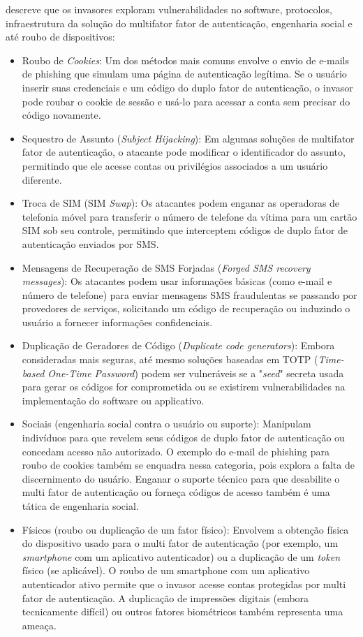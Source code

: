 \documentclass[12pt]{article}
\begin{document}
\cite{article:3} descreve que os invasores exploram vulnerabilidades no software, protocolos,
infraestrutura da solução do multifator fator de autenticação, engenharia social e até roubo
de dispositivos:
\begin{itemize}
  \item Roubo de \textit{Cookies}: Um dos métodos mais comuns envolve o envio de e-mails de phishing
  que simulam uma página de autenticação legítima.
  Se o usuário inserir suas credenciais e um código do duplo fator de autenticação, o invasor
  pode roubar o cookie de sessão e usá-lo para acessar a conta sem precisar do código
  novamente.
  \item Sequestro de Assunto (\textit{Subject Hijacking}): Em algumas soluções de multifator fator de
  autenticação, o atacante pode modificar o identificador do assunto, permitindo que ele
  acesse contas ou privilégios associados a um usuário diferente.
  \item Troca de SIM (SIM \textit{Swap}): Os atacantes podem enganar as operadoras de telefonia móvel
  para transferir o número de telefone da vítima para um cartão SIM sob seu controle,
  permitindo que interceptem códigos de duplo fator de autenticação enviados por SMS.
  \item Mensagens de Recuperação de SMS Forjadas (\textit{Forged SMS recovery messages}): Os
  atacantes podem usar informações básicas (como e-mail e número de telefone) para enviar
  mensagens SMS fraudulentas se passando por provedores de serviços, solicitando um código de
  recuperação ou induzindo o usuário a fornecer informações confidenciais.
  \item Duplicação de Geradores de Código (\textit{Duplicate code generators}): Embora consideradas
  mais seguras, até mesmo soluções baseadas em TOTP (\textit{Time-based One-Time Password}) podem ser
  vulneráveis se a "\textit{seed}" secreta usada para gerar os códigos for comprometida ou se
  existirem vulnerabilidades na implementação do software ou  applicativo.
  \item Sociais (engenharia social contra o usuário ou suporte): Manipulam indivíduos para
  que revelem seus códigos de duplo fator de autenticação ou concedam acesso não autorizado.
  O exemplo do e-mail de phishing para roubo de cookies também se enquadra nessa categoria,
  pois explora a falta de discernimento do usuário.
  Enganar o suporte técnico para que desabilite o multi fator de autenticação ou forneça
  códigos de acesso também é uma tática de engenharia social.
  \item Físicos (roubo ou duplicação de um fator físico): Envolvem a obtenção física do
  dispositivo usado para o multi fator de autenticação (por exemplo, um \textit{smartphone} com um
  aplicativo autenticador) ou a duplicação de um \textit{token} físico (se aplicável).
  O roubo de um smartphone com um aplicativo autenticador ativo permite que o invasor acesse
  contas protegidas por multi fator de autenticação.
  A duplicação de impressões digitais (embora tecnicamente difícil) ou outros fatores
  biométricos também representa uma ameaça.
\end{itemize}
\end{document}

